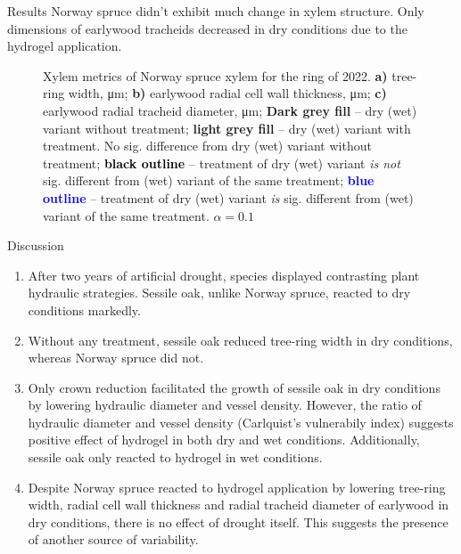 \documentclass[final]{beamer}
\newlength{\colwidth}
\begin{document}
\begin{frame}[t]
\begin{columns}[t]
\begin{column}{\colwidth}
\begin{block}{Results}
Norway spruce didn't exhibit much change in xylem structure. Only dimensions of earlywood tracheids decreased in dry conditions due to the hydrogel application.

\begin{figure}
    
    \caption{
        Xylem metrics of Norway spruce xylem for the ring of 2022.
        \textbf{a)} tree-ring width, \si{\micro\meter};
        \textbf{b)} earlywood radial cell wall thickness, \si{\micro\meter};
        \textbf{c)} earlywood radial tracheid diameter, \si{\micro\meter};
        \textbf{\colorbox{darkgray!30}{Dark grey fill}} -- dry (wet) variant without treatment;
        \textbf{\colorbox{gray!15}{light grey fill}} -- dry (wet) variant with treatment. No sig. difference from dry (wet) variant without treatment;
        \textbf{\textcolor{black}{black outline}} -- treatment of dry (wet) variant \emph{is not} sig. different from (wet) variant of the same treatment;
        \textbf{\textcolor{blue}{blue outline}} -- treatment of dry (wet) variant \emph{is} sig. different from (wet) variant of the same treatment.
        $\alpha = 0.1$
    }
    \label{fig:spruce_box}
\end{figure}
\end{block}

\begin{block}{Discussion}
\begin{multicols}{2}
    \begin{enumerate}
        \item After two years of artificial drought, species displayed contrasting plant hydraulic strategies. Sessile oak, unlike Norway spruce, reacted to dry conditions markedly.
        \item Without any treatment, sessile oak reduced tree-ring width in dry conditions, whereas Norway spruce did not.
        \item Only crown reduction facilitated the growth of sessile oak in dry conditions by lowering hydraulic diameter and vessel density.
            However, the ratio of hydraulic diameter and vessel density (Carlquist's vulnerabily index) suggests positive effect of hydrogel in both dry and wet conditions.
            Additionally, sessile oak only reacted to hydrogel in wet conditions.
        \item Despite Norway spruce reacted to hydrogel application by lowering tree-ring width, radial cell wall thickness and radial tracheid diameter of earlywood in dry conditions, there is no effect of drought itself. This suggests the presence of another source of variability.
    \end{enumerate}
\end{multicols}
\end{block}


\end{column}
\end{columns}
\end{frame}
\end{document}
